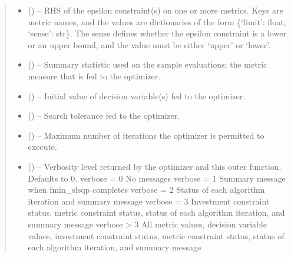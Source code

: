 \documentclass[letterpaper,10pt,english]{sphinxmanual}
\begin{document}
\begin{fulllineitems}
\begin{fulllineitems}
\begin{quote}
\begin{description}
\begin{itemize}
\item {} 
\sphinxAtStartPar
{} () – RHS of the epsilon constraint(s) on one or more metrics. Keys are metric
names, and the values are dictionaries of the form
\{‘limit’: float, ‘sense’: str\}. The sense defines whether the epsilon
constraint is a lower or an upper bound, and the value must be either
‘upper’ or ‘lower’.

\item {} 
\sphinxAtStartPar
{} () – Summary statistic used on the sample evaluations; the metric measure that
is fed to the optimizer.

\item {} 
\sphinxAtStartPar
{} () – Initial value of decision variable(s) fed to the optimizer.

\item {} 
\sphinxAtStartPar
{} () – Search tolerance fed to the optimizer.

\item {} 
\sphinxAtStartPar
{} () – Maximum number of iterations the optimizer is permitted to execute.

\item {} 
\sphinxAtStartPar
{} () – Verbosity level returned by the optimizer and this outer function.
Defaults to 0.
verbose = 0     No messages
verbose = 1     Summary message when fmin\_slsqp completes
verbose = 2     Status of each algorithm iteration and summary message
verbose = 3     Investment constraint status, metric constraint status,
status of each algorithm iteration, and summary message
verbose > 3     All metric values, decision variable values, investment
constraint status, metric constraint status, status of
each algorithm iteration, and summary message

\end{itemize}

\end{description}\end{quote}


\end{fulllineitems}
\end{fulllineitems}
\end{document}
